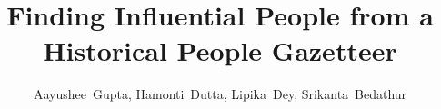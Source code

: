 \documentclass[10pt,journal,compsoc]{IEEEtran}
\begin{document}
%
\title{Finding Influential People from a Historical People Gazetteer}
%
%
%
%


\author{Aayushee~Gupta, Hamonti~Dutta, Lipika~Dey, Srikanta~Bedathur}
\end{document}
